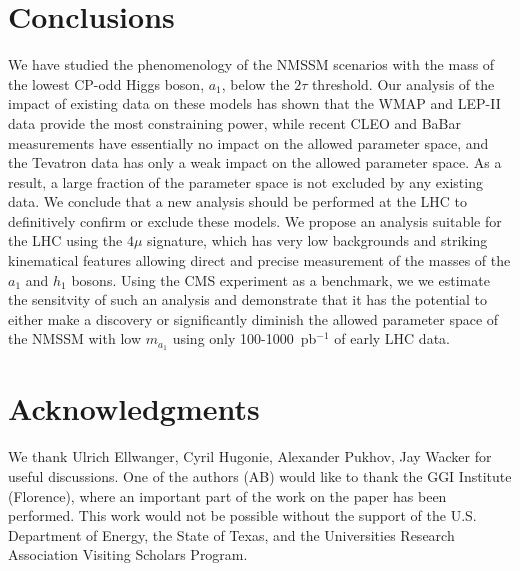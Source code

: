 \documentclass[aps,prl,twocolumn,nofootinbib,superscriptaddress]{revtex4}
\begin{document}
\section{Conclusions}

We have studied the phenomenology of the NMSSM scenarios with the mass
of the lowest CP-odd Higgs boson, $a_1$, below the $2\tau$ threshold.
Our analysis of the impact of existing data on these models has shown
that the WMAP and LEP-II data provide the most constraining power,
while recent CLEO and BaBar measurements have essentially no impact on
the allowed parameter space, and the Tevatron data has only a weak
impact on the allowed parameter space.  As a result, a large fraction
of the parameter space is not excluded by any existing data.  We
conclude that a new analysis should be performed at the LHC to
definitively confirm or exclude these models.  We propose an analysis
suitable for the LHC using the $4\mu$ signature, which has very low
backgrounds and striking kinematical features allowing direct and
precise measurement of the masses of the $a_1$ and $h_1$ bosons.
Using the CMS experiment as a benchmark, we we estimate the sensitvity
of such an analysis and demonstrate that it has the potential to
either make a discovery or significantly diminish the allowed
parameter space of the NMSSM with low $m_{a_1}$ using only
100-1000~pb$^{-1}$ of early LHC data.
  
\section*{Acknowledgments}

We thank Ulrich Ellwanger, Cyril Hugonie, Alexander Pukhov, Jay Wacker
for useful discussions. One of the authors (AB) would like to thank
the GGI Institute (Florence), where an important part of the work on the paper
has been performed. This work would not be possible without the support
of the U.S. Department of Energy, the State of Texas, and the
Universities Research Association Visiting Scholars Program.

\def\Journal#1#2#3#4{{#1} {\bf #2}, #3 (#4)}
\def\NCA{Nuovo Cimento}
\def\NIM{Nucl. Instrum. Methods}
\def\NIMA{{Nucl. Instrum. Methods} A}
\def\NP{Nucl. Phys.} 
\def\NPB{{Nucl. Phys.} B}
\def\PLB{{Phys. Lett.}  B}
\def\PRL{Phys. Rev. Lett.}
\def\RPP{Rep. Prog. Phys.}
\def\PRD{{Phys. Rev.} D}
\def\PR{Phys. Rep.}
\def\PRP{Prog. Theor. Phys.}
\def\ZPC{{Z. Phys.} C}
\def\MPL{{Mod. Phys. Lett.} A}
\def\EPJC{{Eur. Phys. J.} C}
\def\CPC{Comput. Phys. Commun.}
\end{document}
